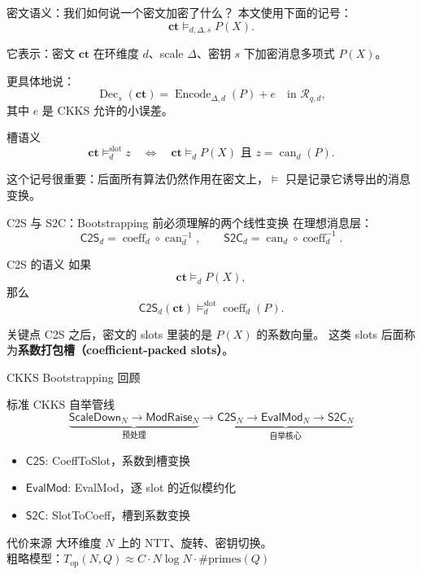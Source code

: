 \documentclass[aspectratio=169, 10pt, xcolor=svgnames, table, UTF8]{ctexbeamer}
\newcommand{\cots}{\mathsf{C2S}}
\newcommand{\stoc}{\mathsf{S2C}}
\newcommand{\evalmod}{\mathsf{EvalMod}}
\newcommand{\sdop}{\mathsf{ScaleDown}}
\newcommand{\mrop}{\mathsf{ModRaise}}
\begin{document}
\begin{frame}{密文语义：我们如何说一个密文加密了什么？}
  本文使用下面的记号：
  \[
  \mathbf{ct}\vDash_{d,\Delta,s}P(X).
  \]
  
  它表示：密文 \(\mathbf{ct}\) 在环维度 \(d\)、scale \(\Delta\)、密钥 \(s\) 下加密消息多项式 \(P(X)\)。
  
  \pause
  更具体地说：
  \[
  \operatorname{Dec}_{s}(\mathbf{ct})
  =
  \operatorname{Encode}_{\Delta,d}(P)+e
  \quad\text{in }\mathcal R_{q,d},
  \]
  其中 \(e\) 是 CKKS 允许的小误差。
  
  \pause
  \begin{block}{槽语义}
    \[
    \mathbf{ct}\vDash_d^{\mathrm{slot}}z
    \quad\Longleftrightarrow\quad
    \mathbf{ct}\vDash_dP(X)
    \text{ 且 } z=\operatorname{can}_d(P).
    \]
  \end{block}
  
  这个记号很重要：后面所有算法仍然作用在密文上，\(\vDash\) 只是记录它诱导出的消息变换。
\end{frame}

\begin{frame}{C2S 与 S2C：Bootstrapping 前必须理解的两个线性变换}
  在理想消息层：
  \[
  \mathsf{C2S}_d
  =
  \operatorname{coeff}_d\circ\operatorname{can}_d^{-1},
  \qquad
  \mathsf{S2C}_d
  =
  \operatorname{can}_d\circ\operatorname{coeff}_d^{-1}.
  \]
  
  \pause
  \begin{block}{C2S 的语义}
    如果
    \[
    \mathbf{ct}\vDash_dP(X),
    \]
    那么
    \[
    \mathsf{C2S}_d(\mathbf{ct})
    \vDash_d^{\mathrm{slot}}
    \operatorname{coeff}_d(P).
    \]
  \end{block}
  
  \pause
  \begin{alertblock}{关键点}
    C2S 之后，密文的 slots 里装的是 \(P(X)\) 的系数向量。
    这类 slots 后面称为\textbf{系数打包槽（coefficient-packed slots）}。
  \end{alertblock}
\end{frame}

\begin{frame}{CKKS Bootstrapping 回顾}
  \begin{block}{标准 CKKS 自举管线}
    \[
    \underbrace{\sdop_N \to \mrop_N}_{\text{预处理}}
    \to
    \underbrace{\cots_N \to \evalmod_N \to \stoc_N}_{\text{自举核心}}
    \]
  \end{block}
  
  \pause
  \begin{itemize}
    \item \(\cots\): CoeffToSlot，系数到槽变换
    \item \(\evalmod\): EvalMod，逐 slot 的近似模约化
    \item \(\stoc\): SlotToCoeff，槽到系数变换
  \end{itemize}
  
  \pause
  \begin{alertblock}{代价来源}
    大环维度 \(N\) 上的 NTT、旋转、密钥切换。\\
    粗略模型：\(T_{\mathrm{op}}(N, Q) \approx C \cdot N \log N \cdot \#\mathrm{primes}(Q)\)
  \end{alertblock}
\end{frame}
\end{document}
